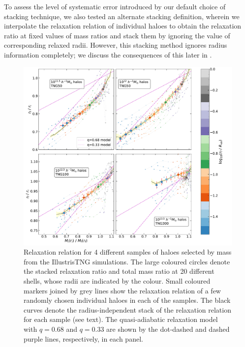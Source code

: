 To assess the level of systematic error introduced by our default choice of stacking technique, we also tested an alternate stacking definition, wherein we interpolate the relaxation relation of individual haloes to obtain the relaxation ratio at fixed values of mass ratios and stack them by ignoring the value of corresponding relaxed radii. However, this stacking method ignores radius information completely; we discuss the consequences of this later in .

\begin{figure}
    \centering
    \includegraphics[width=\linewidth,trim={0 0 0cm 0},clip]{plots/indv_relx-reln_all.pdf}
    \caption{Relaxation relation for 4 different samples of haloes selected by mass from the IllustrisTNG simulations. The large coloured circles denote the stacked relaxation ratio and total mass ratio at 20 different shells, whose radii are indicated by the colour. Small coloured markers joined by grey lines show the relaxation relation of a few randomly chosen individual haloes in each of the samples. The black curves denote the radius-independent stack of the relaxation relation for each sample (see text). The quasi-adiabatic relaxation model  with $q=0.68$ and $q=0.33$ are shown by the dot-dashed and dashed purple lines, respectively, in each panel.} 
    \label{fig:relx-results-simple-ch:z0main}
\end{figure}




